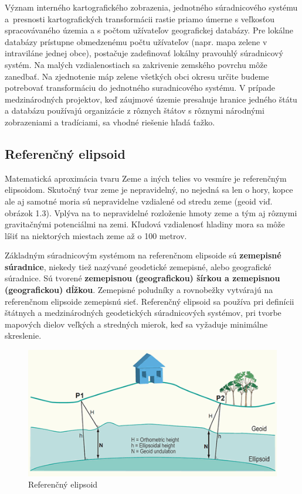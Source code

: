 Význam interného kartografického zobrazenia, jednotného súradnicového systému a~presnosti kartografických transformácii rastie priamo úmerne s veľkosťou
spracová\-va\-né\-ho územia a s počtom užívateľov geografickej databázy. Pre
lokálne
databázy prístupne obmedzenému počtu užívateľov (napr. mapa zelene v intraviláne
jednej obce), postačuje zadefinovať lokálny pravouhlý súradnicový systém. Na
malých vzdialenostiach sa zakrivenie zemského povrchu môže zanedbať. Na
zjednotenie máp zelene všetkých obci okresu určite budeme potrebovať
transformáciu do jednotného su\-rad\-ni\-co\-vé\-ho systému. V prípade
medzinárodných
projektov, keď záujmové územie presahuje hranice jedného štátu a databázu
používajú organizácie z rôznych štátov s rôznymi národnými zobrazeniami a
tradíciami, sa vhodné riešenie hľadá ťažko.

\subsection{Referenčný elipsoid} 
Matematická aproximácia tvaru Zeme a iných telies vo vesmíre je referenčným elipsoidom. Skutočný tvar zeme je nepravidelný, no nejedná sa len o hory, kopce ale aj samotné moria sú nepravidelne vzdialené od stredu zeme (geoid viď. obrázok 1.3). Vplýva na to nepravidelné rozloženie hmoty zeme a tým aj rôznymi gravitačnými potenciálmi na zemi. Kľudová vzdialenosť hladiny mora sa môže líšiť na niektorých miestach zeme až o 100 metrov.

Základným súradnicovým systémom na referenčnom elipsoide sú \textbf{zemepisné
sú\-rad\-ni\-ce},
niekedy tiež nazývané geodetické zemepisné, alebo geografické sú\-rad\-ni\-ce.
Sú tvorené \textbf{zemepisnou (geografickou) šírkou a zemepisnou (geografickou) dĺžkou}. Zemepisné poludníky a
rovnobežky vytvárajú na referenčnom elipsoide zemepisnú sieť. Referenčný
elipsoid sa používa pri definícii štátnych a medzinárodných geodetických
súradnicových systémov, pri tvorbe mapových dielov veľkých a stredných mierok,
keď sa vyžaduje minimálne skreslenie.

\begin{figure}[ht]
\centering
\includegraphics[width=14.5cm]{obr/relationshipse}
\caption{Referenčný elipsoid}
\end{figure}

